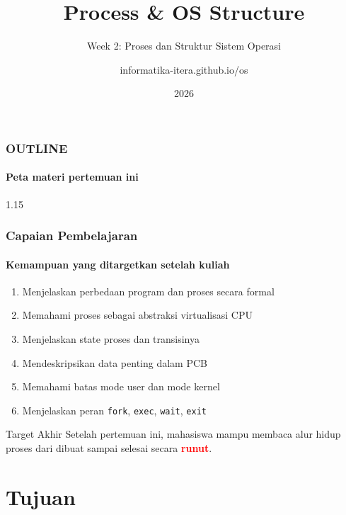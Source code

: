 \documentclass[t,aspectratio=169,xcolor=dvipsnames]{beamer}
\title[Process \& OS Structure]{Process \& OS Structure}
\subtitle{Week 2: Proses dan Struktur Sistem Operasi}
\author[informatika-itera.github.io/os]{informatika-itera.github.io/os}
\institute[ITERA]{Program Studi Teknik Informatika \\ Institut Teknologi Sumatera}
\date{\textcolor{nyublue}{2026}}
\newcommand{\tem}[1]{\textbf{\textcolor{red}{#1}}}
\begin{document}
\begin{frame}
    \titlepage
\end{frame}

\begin{frame}
    \frametitle{OUTLINE}
    \framesubtitle{Peta materi pertemuan ini}
    \small
    \begin{spacing}{1.15}
        \tableofcontents
    \end{spacing}
\end{frame}

\begin{frame}
    \frametitle{Capaian Pembelajaran}
    \framesubtitle{Kemampuan yang ditargetkan setelah kuliah}
    \small
    \begin{enumerate}
        \item Menjelaskan perbedaan program dan proses secara formal
        \item Memahami proses sebagai abstraksi virtualisasi CPU
        \item Menjelaskan state proses dan transisinya
        \item Mendeskripsikan data penting dalam PCB
        \item Memahami batas mode user dan mode kernel
        \item Menjelaskan peran \texttt{fork}, \texttt{exec}, \texttt{wait}, \texttt{exit}
    \end{enumerate}
    \begin{exampleblock}{Target Akhir}
        Setelah pertemuan ini, mahasiswa mampu membaca alur hidup proses dari dibuat sampai selesai secara \tem{runut}.
    \end{exampleblock}
\end{frame}

\section{Tujuan}
\end{document}

